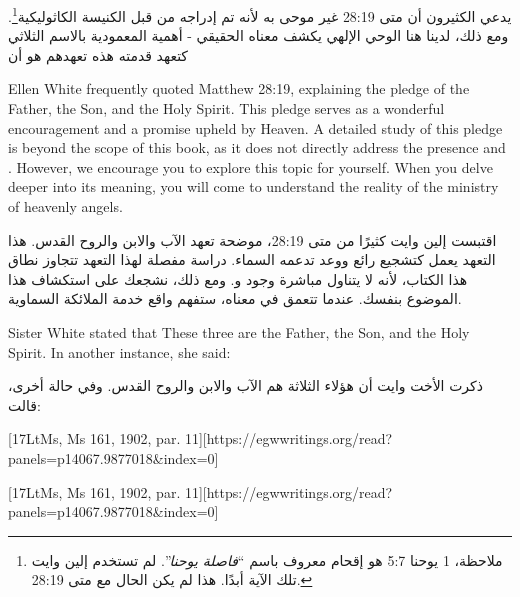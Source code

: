يدعي الكثيرون أن متى 28:19 غير موحى به لأنه تم إدراجه من قبل الكنيسة الكاثوليكية\footnote{ملاحظة، 1 يوحنا 5:7  هو إقحام معروف باسم “\textit{فاصلة يوحنا}”. لم تستخدم إلين وايت تلك الآية أبدًا. هذا لم يكن الحال مع متى 28:19.}. ومع ذلك، لدينا هنا الوحي الإلهي يكشف معناه الحقيقي - أهمية المعمودية بالاسم الثلاثي كتعهد قدمته هذه  تعهدهم هو أن 


Ellen White frequently quoted Matthew 28:19, explaining the pledge of the Father, the Son, and the Holy Spirit. This pledge serves as a wonderful encouragement and a promise upheld by Heaven. A detailed study of this pledge is beyond the scope of this book, as it does not directly address the presence and . However, we encourage you to explore this topic for yourself. When you delve deeper into its meaning, you will come to understand the reality of the ministry of heavenly angels.


اقتبست إلين وايت كثيرًا من متى 28:19، موضحة تعهد الآب والابن والروح القدس. هذا التعهد يعمل كتشجيع رائع ووعد تدعمه السماء. دراسة مفصلة لهذا التعهد تتجاوز نطاق هذا الكتاب، لأنه لا يتناول مباشرة وجود و. ومع ذلك، نشجعك على استكشاف هذا الموضوع بنفسك. عندما تتعمق في معناه، ستفهم واقع خدمة الملائكة السماوية.


Sister White stated that  These three are the Father, the Son, and the Holy Spirit. In another instance, she said:


ذكرت الأخت وايت أن  هؤلاء الثلاثة هم الآب والابن والروح القدس. وفي حالة أخرى، قالت:


[17LtMs, Ms 161, 1902, par. 11][https://egwwritings.org/read?panels=p14067.9877018&index=0]


[17LtMs, Ms 161, 1902, par. 11][https://egwwritings.org/read?panels=p14067.9877018&index=0]


